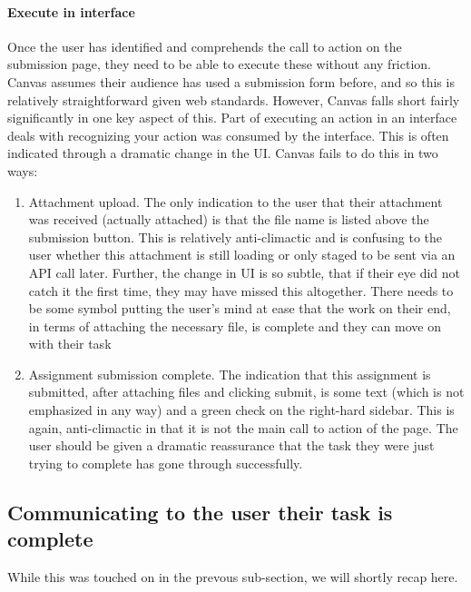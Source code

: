 \paragraph{Execute in interface}
Once the user has identified and comprehends the call to action on the submission page, they need to be able to execute these without any friction. Canvas assumes their audience has used a submission form before, and so this is relatively straightforward given web standards. However, Canvas falls short fairly significantly in one key aspect of this. Part of executing an action in an interface deals with recognizing your action was consumed by the interface. This is often indicated through a dramatic change in the UI. Canvas fails to do this in two ways:

\begin{enumerate}
\item
Attachment upload. The only indication to the user that their attachment was received (actually attached) is that the file name is listed above the submission button. This is relatively anti-climactic and is confusing to the user whether this attachment is still loading or only staged to be sent via an API call later. Further, the change in UI is so subtle, that if their eye did not catch it the first time, they may have missed this altogether. There needs to be some symbol putting the user's mind at ease that the work on their end, in terms of attaching the necessary file, is complete and they can move on with their task
\item
Assignment submission complete. The indication that this assignment is submitted, after attaching files and clicking submit, is some text (which is not emphasized in any way) and a green check on the right-hard sidebar. This is again, anti-climactic in that it is not the main call to action of the page. The user should be given a dramatic reassurance that the task they were just trying to complete has gone through successfully.
\end{enumerate}

\subsection{Communicating to the user their task is complete}

While this was touched on in the prevous sub-section, we will shortly recap here.

